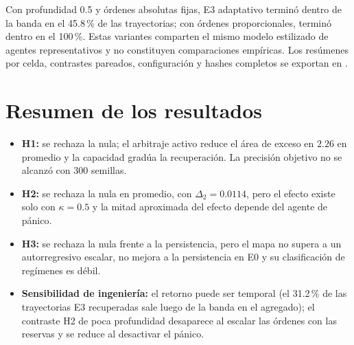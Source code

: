 Con profundidad 0.5 y órdenes absolutas fijas, E3 adaptativo terminó dentro de la banda en el 45.8\,\% de las trayectorias; con órdenes proporcionales, terminó dentro en el 100\,\%. Estas variantes comparten el mismo modelo estilizado de agentes representativos y no constituyen comparaciones empíricas. Los resúmenes por celda, contrastes pareados, configuración y hashes completos se exportan en .

\section{Resumen de los resultados}

\begin{itemize}
  \item \textbf{H1:} se rechaza la nula; el arbitraje activo reduce el área de exceso en $2.26$ en promedio y la capacidad gradúa la recuperación. La precisión objetivo no se alcanzó con 300 semillas.
  \item \textbf{H2:} se rechaza la nula en promedio, con $\Delta_2=0.0114$, pero el efecto existe solo con $\kappa=0.5$ y la mitad aproximada del efecto depende del agente de pánico.
  \item \textbf{H3:} se rechaza la nula frente a la persistencia, pero el mapa no supera a un autorregresivo escalar, no mejora a la persistencia en E0 y su clasificación de regímenes es débil.
  \item \textbf{Sensibilidad de ingeniería:} el retorno puede ser temporal (el 31.2\,\% de las trayectorias E3 recuperadas sale luego de la banda en el agregado); el contraste H2 de poca profundidad desaparece al escalar las órdenes con las reservas y se reduce al desactivar el pánico.
\end{itemize}
